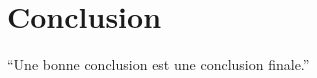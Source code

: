 \documentclass[a4paper,12pt]{article} %
\begin{document}
\section{Conclusion} %
\newpage
\enquote{Une bonne conclusion est une conclusion finale.} \citep{Hoo12} %

\end{document}
